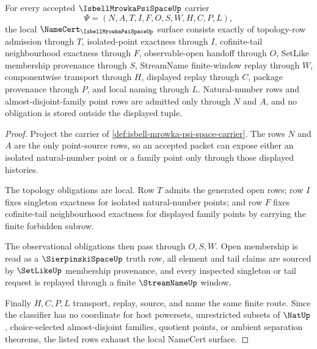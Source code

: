 \begin{theorem}
\label{thm:isbell-mrowka-psi-space-namecert-obligations}
For every accepted $\IsbellMrowkaPsiSpaceUp$ carrier
$$
\Psi=(N,A,T,I,F,O,S,W,H,C,P,L),
$$
the local $\NameCert_{\IsbellMrowkaPsiSpaceUp}$ surface consists exactly of topology-row admission through $T$, isolated-point exactness through $I$, cofinite-tail neighbourhood exactness through $F$, observable-open handoff through $O$, SetLike membership provenance through $S$, StreamName finite-window replay through $W$, componentwise transport through $H$, displayed replay through $C$, package provenance through $P$, and local naming through $L$. Natural-number rows and almost-disjoint-family point rows are admitted only through $N$ and $A$, and no obligation is stored outside the displayed tuple.
\end{theorem}
\begin{proof}
Project the carrier of \autoref{def:isbell-mrowka-psi-space-carrier}. The rows $N$ and $A$ are the only point-source rows, so an accepted packet can expose either an isolated natural-number point or a family point only through those displayed histories.

The topology obligations are local. Row $T$ admits the generated open rows; row $I$ fixes singleton exactness for isolated natural-number points; and row $F$ fixes cofinite-tail neighbourhood exactness for displayed family points by carrying the finite forbidden subrow.

The observational obligations then pass through $O,S,W$. Open membership is read as a $\SierpinskiSpaceUp$ truth row, all element and tail claims are sourced by $\SetLikeUp$ membership provenance, and every inspected singleton or tail request is replayed through a finite $\StreamNameUp$ window.

Finally $H,C,P,L$ transport, replay, source, and name the same finite route. Since the classifier has no coordinate for host powersets, unrestricted subsets of $\NatUp$, choice-selected almost-disjoint families, quotient points, or ambient separation theorems, the listed rows exhaust the local NameCert surface.
\end{proof}

